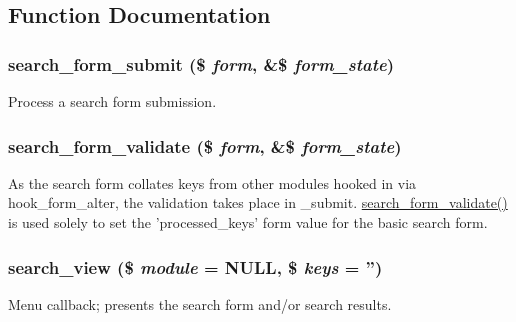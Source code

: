 \subsection{Function Documentation}
\hypertarget{search_8pages_8inc_a709df5e6ae41e0d9cccd0c1f3c0a410e}{
\subsubsection[{search\_\-form\_\-submit}]{\setlength{\rightskip}{0pt plus 5cm}search\_\-form\_\-submit (\$ {\em form}, \/  \&\$ {\em form\_\-state})}}
\label{search_8pages_8inc_a709df5e6ae41e0d9cccd0c1f3c0a410e}
Process a search form submission. \hypertarget{search_8pages_8inc_a9b4ec561b0b5121050f68541e7047a6d}{
\subsubsection[{search\_\-form\_\-validate}]{\setlength{\rightskip}{0pt plus 5cm}search\_\-form\_\-validate (\$ {\em form}, \/  \&\$ {\em form\_\-state})}}
\label{search_8pages_8inc_a9b4ec561b0b5121050f68541e7047a6d}
As the search form collates keys from other modules hooked in via hook\_\-form\_\-alter, the validation takes place in \_\-submit. \hyperlink{search_8pages_8inc_a9b4ec561b0b5121050f68541e7047a6d}{search\_\-form\_\-validate()} is used solely to set the 'processed\_\-keys' form value for the basic search form. \hypertarget{search_8pages_8inc_aa4798bb08a1df2c280b943182d53892e}{
\subsubsection[{search\_\-view}]{\setlength{\rightskip}{0pt plus 5cm}search\_\-view (\$ {\em module} = {\ttfamily NULL}, \/  \$ {\em keys} = {\ttfamily ''})}}
\label{search_8pages_8inc_aa4798bb08a1df2c280b943182d53892e}
Menu callback; presents the search form and/or search results.


